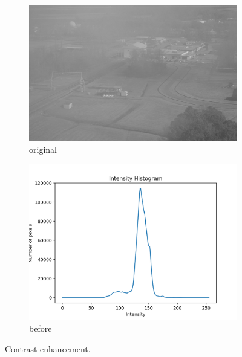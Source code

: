 \documentclass[11pt,a4paper]{article}
\begin{document}
\clearpage

\begin{figure}[ht]
	\ContinuedFloat*
	\centering
	\begin{subfigure}[h]{0.7\textwidth}
		\includegraphics[width=\textwidth]{figs/lc2_gray}
		\caption{original}
		\label{fig:lc2_orig}
	\end{subfigure}
	
	\begin{subfigure}[h]{0.75\textwidth}
		\includegraphics[width=\textwidth]{figs/lc2_hist_bef}
		\caption{before}
		\label{fig:hist_bef_2}
	\end{subfigure}
	
	\caption{Contrast enhancement.}
	\label{fig:eq2}
\end{figure}

\clearpage
\end{document}
